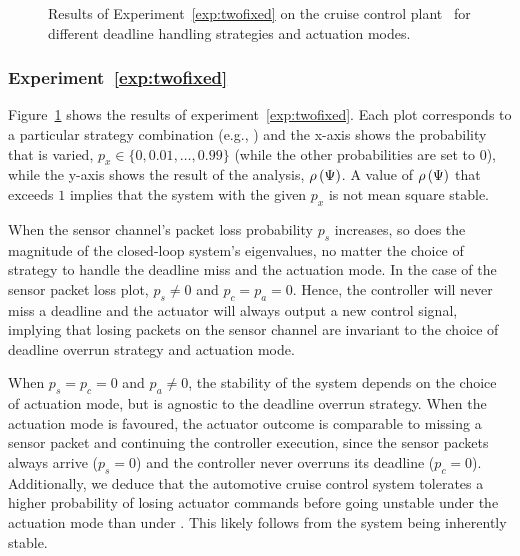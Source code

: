 \begin{figure}[t]
    \caption{Results of Experiment~\ref{exp:twofixed} on the cruise control plant~\cite{Ghosh:2018} for different deadline handling strategies and actuation modes.}
    \label{fig:samarjit-fix2}
\end{figure}

\subsubsection*{Experiment~\ref{exp:twofixed}}%
%
Figure~\ref{fig:samarjit-fix2} shows the results of experiment~\ref{exp:twofixed}.
Each plot corresponds to a particular strategy combination (e.g., \tKZ{}) and the x-axis shows the probability that is varied, $p_x \in \{0,0.01,\dots,0.99\}$ (while the other probabilities are set to $0$), while the y-axis shows the result of the analysis, $\rho\left( \Psi \right)$.
A value of $\rho\left( \Psi \right)$ that exceeds $1$ implies that the system with the given $p_x$ is not mean square stable.

When the sensor channel's packet loss probability $p_s$ increases, so does the magnitude of the closed-loop system's eigenvalues, no matter the choice of strategy to handle the deadline miss and the actuation mode.
In the case of the sensor packet loss plot, $p_s \neq 0$ and $p_c = p_a = 0$.
Hence, the controller will never miss a deadline and the actuator will always output a new control signal, implying that losing packets on the sensor channel are invariant to the choice of deadline overrun strategy and actuation mode.

When $p_s = p_c=0$ and $p_a \neq 0$, the stability of the system depends on the choice of actuation mode, but is agnostic to the deadline overrun strategy.
When the \tH{} actuation mode is favoured, the actuator outcome is comparable to missing a sensor packet and continuing the controller execution, since the sensor packets always arrive ($p_s=0$) and the controller never overruns its deadline ($p_c=0$).
Additionally, we deduce that the automotive cruise control system tolerates a higher probability of losing actuator commands before going unstable under the \tZ{} actuation mode than under \tH{}.
This likely follows from the system being inherently stable.

